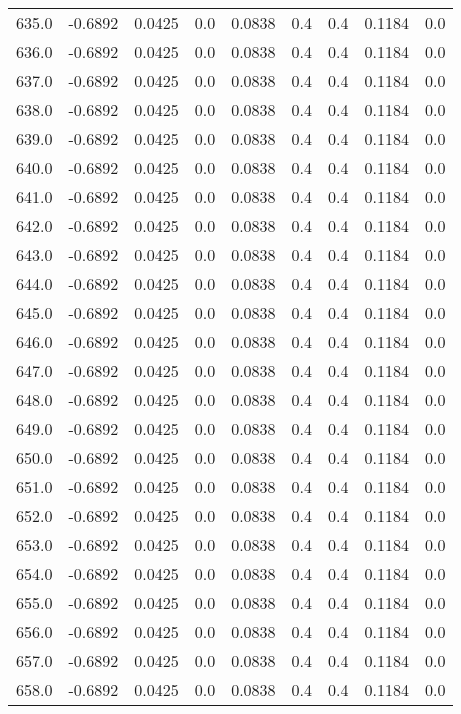 \begin{longtable}{lrrrrrrrr}
635.0 & -0.6892 & 0.0425 & 0.0 & 0.0838 & 0.4 & 0.4 & 0.1184 & 0.0 \\
636.0 & -0.6892 & 0.0425 & 0.0 & 0.0838 & 0.4 & 0.4 & 0.1184 & 0.0 \\
637.0 & -0.6892 & 0.0425 & 0.0 & 0.0838 & 0.4 & 0.4 & 0.1184 & 0.0 \\
638.0 & -0.6892 & 0.0425 & 0.0 & 0.0838 & 0.4 & 0.4 & 0.1184 & 0.0 \\
639.0 & -0.6892 & 0.0425 & 0.0 & 0.0838 & 0.4 & 0.4 & 0.1184 & 0.0 \\
640.0 & -0.6892 & 0.0425 & 0.0 & 0.0838 & 0.4 & 0.4 & 0.1184 & 0.0 \\
641.0 & -0.6892 & 0.0425 & 0.0 & 0.0838 & 0.4 & 0.4 & 0.1184 & 0.0 \\
642.0 & -0.6892 & 0.0425 & 0.0 & 0.0838 & 0.4 & 0.4 & 0.1184 & 0.0 \\
643.0 & -0.6892 & 0.0425 & 0.0 & 0.0838 & 0.4 & 0.4 & 0.1184 & 0.0 \\
644.0 & -0.6892 & 0.0425 & 0.0 & 0.0838 & 0.4 & 0.4 & 0.1184 & 0.0 \\
645.0 & -0.6892 & 0.0425 & 0.0 & 0.0838 & 0.4 & 0.4 & 0.1184 & 0.0 \\
646.0 & -0.6892 & 0.0425 & 0.0 & 0.0838 & 0.4 & 0.4 & 0.1184 & 0.0 \\
647.0 & -0.6892 & 0.0425 & 0.0 & 0.0838 & 0.4 & 0.4 & 0.1184 & 0.0 \\
648.0 & -0.6892 & 0.0425 & 0.0 & 0.0838 & 0.4 & 0.4 & 0.1184 & 0.0 \\
649.0 & -0.6892 & 0.0425 & 0.0 & 0.0838 & 0.4 & 0.4 & 0.1184 & 0.0 \\
650.0 & -0.6892 & 0.0425 & 0.0 & 0.0838 & 0.4 & 0.4 & 0.1184 & 0.0 \\
651.0 & -0.6892 & 0.0425 & 0.0 & 0.0838 & 0.4 & 0.4 & 0.1184 & 0.0 \\
652.0 & -0.6892 & 0.0425 & 0.0 & 0.0838 & 0.4 & 0.4 & 0.1184 & 0.0 \\
653.0 & -0.6892 & 0.0425 & 0.0 & 0.0838 & 0.4 & 0.4 & 0.1184 & 0.0 \\
654.0 & -0.6892 & 0.0425 & 0.0 & 0.0838 & 0.4 & 0.4 & 0.1184 & 0.0 \\
655.0 & -0.6892 & 0.0425 & 0.0 & 0.0838 & 0.4 & 0.4 & 0.1184 & 0.0 \\
656.0 & -0.6892 & 0.0425 & 0.0 & 0.0838 & 0.4 & 0.4 & 0.1184 & 0.0 \\
657.0 & -0.6892 & 0.0425 & 0.0 & 0.0838 & 0.4 & 0.4 & 0.1184 & 0.0 \\
658.0 & -0.6892 & 0.0425 & 0.0 & 0.0838 & 0.4 & 0.4 & 0.1184 & 0.0 \\

\end{longtable}
